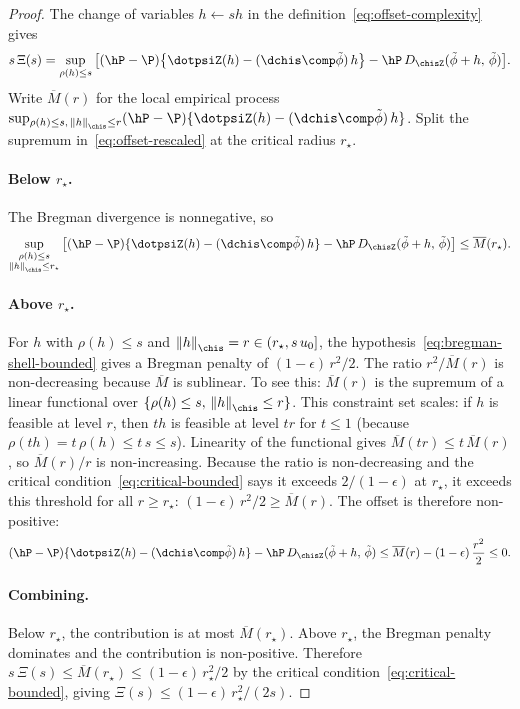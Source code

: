 \documentclass{article}
\begin{document}
\begin{proof}
The change of variables $h \leftarrow sh$
in the definition~\eqref{eq:offset-complexity}
gives
\begin{equation}
\label{eq:offset-rescaled}
s\,\Xi(s)
  = \sup_{\rho(h) \le s}
  \qty[(\hP - \P)\qty{\dotpsiZ(h) - (\dchis \comp \tilde\phi)\, h}
    - \hP\, D_{\chisZ}(\tilde\phi + h,\, \tilde\phi)].
\end{equation}
Write $\overline{M}(r)$ for the local empirical process
$\sup_{\substack{\rho(h) \le s,\,
    \norm{h}_{\chis} \le r}}
  (\hP - \P)\{\dotpsiZ(h) - (\dchis \comp \tilde\phi)\, h\}$.
Split the supremum
in~\eqref{eq:offset-rescaled}
at the critical radius $r_\star$.

\paragraph{Below $r_\star$.}
The Bregman divergence is nonnegative, so
\[
\sup_{\substack{\rho(h) \le s \\ \norm{h}_{\chis} \le r_\star}}
  \qty[(\hP - \P)\{\dotpsiZ(h) - (\dchis \comp \tilde\phi)\, h\}
    - \hP\, D_{\chisZ}(\tilde\phi + h,\, \tilde\phi)]
  \le \overline{M}(r_\star).
\]

\paragraph{Above $r_\star$.}
For $h$ with $\rho(h) \le s$
and $\norm{h}_{\chis} = r \in (r_\star, s\, u_0]$,
the hypothesis~\eqref{eq:bregman-shell-bounded}
gives a Bregman penalty of $(1-\epsilon)\, r^2/2$.
The ratio
$r^2 / \overline{M}(r)$
is non-decreasing
because $\overline{M}$ is sublinear.
To see this: $\overline{M}(r)$
is the supremum of a linear functional
over $\{\rho(h) \le s,\, \norm{h}_{\chis} \le r\}$.
This constraint set scales:
if $h$ is feasible at level $r$,
then $th$ is feasible at level $tr$
for $t \le 1$
(because $\rho(th) = t\,\rho(h) \le t\, s \le s$).
Linearity of the functional gives
$\overline{M}(tr) \le t\, \overline{M}(r)$,
so $\overline{M}(r)/r$ is non-increasing.
Because the ratio is non-decreasing
and the critical condition~\eqref{eq:critical-bounded}
says it exceeds $2/(1-\epsilon)$ at $r_\star$,
it exceeds this threshold for all $r \ge r_\star$:
$(1-\epsilon)\, r^2/2 \ge \overline{M}(r)$.
The offset is therefore non-positive:
\[
(\hP - \P)\{\dotpsiZ(h) - (\dchis \comp \tilde\phi)\, h\}
  - \hP\, D_{\chisZ}(\tilde\phi + h,\, \tilde\phi)
  \le \overline{M}(r) - (1-\epsilon)\, \frac{r^2}{2}
  \le 0.
\]

\paragraph{Combining.}
Below $r_\star$, the contribution is at most $\overline{M}(r_\star)$.
Above $r_\star$, the Bregman penalty dominates
and the contribution is non-positive.
Therefore $s\,\Xi(s) \le \overline{M}(r_\star)
  \le (1-\epsilon)\, r_\star^2/2$
by the critical condition~\eqref{eq:critical-bounded},
giving $\Xi(s) \le (1-\epsilon)\, r_\star^2/(2s)$.
\end{proof}
\end{document}
